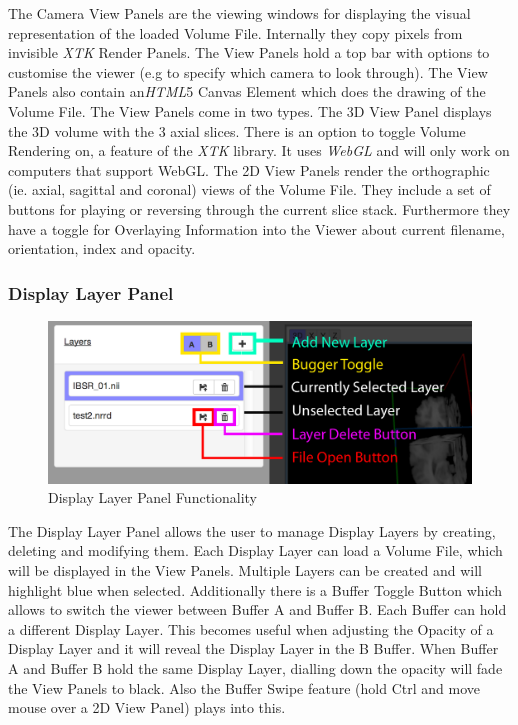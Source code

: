 \documentclass[a4paper,11pt,twoside]{article}
\begin{document}
The Camera View Panels are the viewing windows for displaying the visual representation of the loaded Volume File. Internally they copy pixels from invisible \textit{XTK} Render Panels. The View Panels hold a top bar with options to customise the viewer (e.g to specify which camera to look through). The View Panels also contain an\textit{HTML}5 Canvas Element which does the drawing of the Volume File. The View Panels come in two types. The 3D View Panel displays the 3D volume with the 3 axial slices. There is an option to toggle Volume Rendering on, a feature of the \textit{XTK} library. It uses \textit{WebGL} and will only work on computers that support WebGL. The 2D View Panels render the orthographic (ie. axial, sagittal and coronal) views of the Volume File. They include a set of buttons for playing or reversing through the current slice stack. Furthermore they have a toggle for Overlaying Information into the Viewer about current filename, orientation, index and opacity.




\subsubsection{Display Layer Panel}

\begin{figure}[ht!]
\centering
\includegraphics[width=140mm]{graphics/features_03.png}
\caption{Display Layer Panel Functionality}
\label{fig:UIdesign1}
\end{figure}

The Display Layer Panel allows the user to manage Display Layers by creating, deleting and modifying them. Each Display Layer can load a Volume File, which will be displayed in the View Panels. Multiple Layers can be created and will highlight blue when selected. Additionally there is a Buffer Toggle Button which allows to switch the viewer between Buffer A and Buffer B. Each Buffer can hold a different Display Layer. This becomes useful when adjusting the Opacity of a Display Layer and it will reveal the Display Layer in the B Buffer. When Buffer A and Buffer B hold the same Display Layer, dialling down the opacity will fade the View Panels to black. Also the Buffer Swipe feature (hold Ctrl and move mouse over a 2D View Panel) plays into this.
\end{document}
